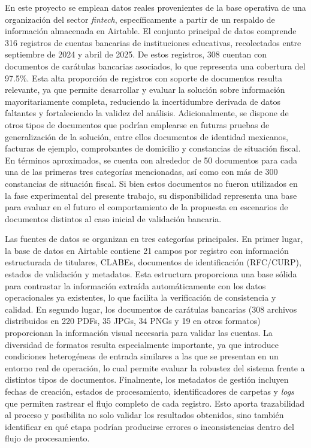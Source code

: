 En este proyecto se emplean datos reales provenientes de la base operativa de una organización del sector \textit{fintech}, específicamente a partir de un respaldo de información almacenada en Airtable. El conjunto principal de datos comprende 316 registros de cuentas bancarias de instituciones educativas, recolectados entre septiembre de 2024 y abril de 2025. De estos registros, 308 cuentan con documentos de carátulas bancarias asociados, lo que representa una cobertura del 97.5\%. Esta alta proporción de registros con soporte de documentos resulta relevante, ya que permite desarrollar y evaluar la solución sobre información mayoritariamente completa, reduciendo la incertidumbre derivada de datos faltantes y fortaleciendo la validez del análisis. Adicionalmente, se dispone de otros tipos de documentos que podrían emplearse en futuras pruebas de generalización de la solución, entre ellos documentos de identidad mexicanos, facturas de ejemplo, comprobantes de domicilio y constancias de situación fiscal. En términos aproximados, se cuenta con alrededor de 50 documentos para cada una de las primeras tres categorías mencionadas, así como con más de 300 constancias de situación fiscal. Si bien estos documentos no fueron utilizados en la fase experimental del presente trabajo, su disponibilidad representa una base para evaluar en el futuro el comportamiento de la propuesta en escenarios de documentos distintos al caso inicial de validación bancaria.

Las fuentes de datos se organizan en tres categorías principales. En primer lugar, la base de datos en Airtable contiene 21 campos por registro con información estructurada de titulares, CLABEs, documentos de identificación (RFC/CURP), estados de validación y metadatos. Esta estructura proporciona una base sólida para contrastar la información extraída automáticamente con los datos operacionales ya existentes, lo que facilita la verificación de consistencia y calidad. En segundo lugar, los documentos de carátulas bancarias (308 archivos distribuidos en 220 PDFs, 35 JPGs, 34 PNGs y 19 en otros formatos) proporcionan la información visual necesaria para validar las cuentas. La diversidad de formatos resulta especialmente importante, ya que introduce condiciones heterogéneas de entrada similares a las que se presentan en un entorno real de operación, lo cual permite evaluar la robustez del sistema frente a distintos tipos de documentos. Finalmente, los metadatos de gestión incluyen fechas de creación, estados de procesamiento, identificadores de carpetas y \textit{logs} que permiten rastrear el flujo completo de cada registro. Esto aporta trazabilidad al proceso y posibilita no solo validar los resultados obtenidos, sino también identificar en qué etapa podrían producirse errores o inconsistencias dentro del flujo de procesamiento.

